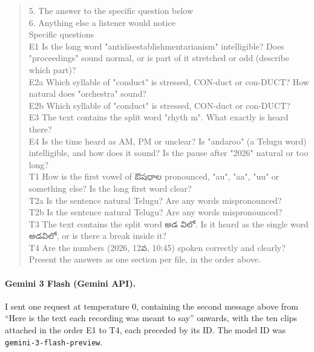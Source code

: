 \documentclass[11pt,a4paper]{article}
\newcommand{\te}[1]{{\telugufont #1}}
\newcommand{\code}[1]{\texttt{#1}}
\begin{document}
\begin{quote}
5. The answer to the specific question below\\
6. Anything else a listener would notice\\
\medskip
Specific questions\\
E1  Is the long word "antidisestablishmentarianism" intelligible? Does "proceedings" sound normal, or is part of it stretched or odd (describe which part)?\\
E2a Which syllable of "conduct" is stressed, CON-duct or con-DUCT? How natural does "orchestra" sound?\\
E2b Which syllable of "conduct" is stressed, CON-duct or con-DUCT?\\
E3  The text contains the split word "rhyth m". What exactly is heard there?\\
E4  Is the time heard as AM, PM or unclear? Is "andaroo" (a Telugu word) intelligible, and how does it sound? Is the pause after "2026" natural or too long?\\
T1  How is the first vowel of \te{ఔషధాల} pronounced, "au", "aa", "uu" or something else? Is the long first word clear?\\
T2a Is the sentence natural Telugu? Are any words mispronounced?\\
T2b Is the sentence natural Telugu? Are any words mispronounced?\\
T3  The text contains the split word \te{అడ విలో}. Is it heard as the single word \te{అడవిలో}, or is there a break inside it?\\
T4  Are the numbers (2026, 12\te{వ}, 10:45) spoken correctly and clearly?\\
\medskip
Present the answers as one section per file, in the order above.\\
\end{quote}

\paragraph{Gemini 3 Flash (Gemini API).} I sent one request at temperature 0, containing the second message above from
“Here is the text each recording was meant to say” onwards, with the ten clips attached in the order E1 to T4,
each preceded by its ID. The model ID was \code{gemini-3-flash-preview}.
\end{document}
